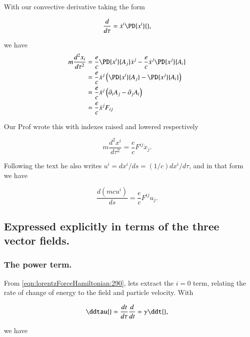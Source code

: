 With our convective derivative taking the form

\begin{equation}\label{eqn:lorentzForceHamiltonian:270}
\frac{d}{d\tau} = \dot{x}^i \PD{x^i}{},
\end{equation}

we have
\begin{align*}
m \frac{d^2 x_i}{d\tau^2} 
&= 
\frac{e}{c} \PD{x^i}{A_j} \dot{x}^j
- 
\frac{e}{c} 
\dot{x}^j 
\PD{x^j}{A_i} \\
&=
\frac{e}{c} 
\dot{x}^j \left( 
\PD{x^i}{A_j} 
-\PD{x^j}{A_i} 
\right) \\
&=
\frac{e}{c} 
\dot{x}^j \left( \partial_i A_j - \partial_j A_i
\right) \\
&=
\frac{e}{c} 
\dot{x}^j F_{ij}
\end{align*}

Our Prof wrote this with indexes raised and lowered respectively

\begin{equation}\label{eqn:lorentzForceHamiltonian:280}
m \frac{d^2 x^i}{d\tau^2} = \frac{e}{c} F^{ij} \dot{x}_j .
\end{equation}

Following the text \cite{landau1980classical} he also writes $u^i = dx^i/ds = (1/c) dx^i/d\tau$, and in that form we have

\begin{equation}\label{eqn:lorentzForceHamiltonian:290}
\frac{d (m c u^i)}{ds} = \frac{e}{c} F^{ij} u_j.
\end{equation}

\subsection{Expressed explicitly in terms of the three vector fields.}
\subsubsection{The power term.}

From \ref{eqn:lorentzForceHamiltonian:290}, lets extract the $i=0$ term, relating the rate of change of energy to the field and particle velocity.  With

\begin{equation}\label{eqn:lorentzForceHamiltonian:300}
\ddtau{} = \frac{dt}{d\tau} \frac{d}{dt} = \gamma \ddt{},
\end{equation}

we have

